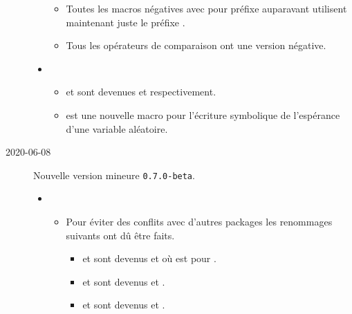 \documentclass[12pt,a4paper]{book}
\begin{document}
\begin{description}
\begin{itemize}[itemsep=.5em]
\begin{itemize}[itemsep=.5em]
            \item Toutes les macros négatives avec pour préfixe  auparavant utilisent maintenant juste le préfixe .
    
            \item Tous les opérateurs de comparaison ont une version négative.
        \end{itemize}
    
    
    
    
        \separation
        \item {}
        \begin{itemize}[itemsep=.5em]
            \item {} et  sont devenues  et  respectivement.
            
            \item {} est une nouvelle macro pour l'écriture symbolique de l'espérance d'une  variable aléatoire.
        \end{itemize}
    \end{itemize}
    


    \medskip
    \item[2020-06-08] Nouvelle version mineure \verb+0.7.0-beta+.
    
    \begin{itemize}[itemsep=.5em]
        \item {}
        \begin{itemize}[itemsep=.5em]
            \item Pour éviter des conflits avec d'autres packages les renommages suivants ont dû être faits.
            \begin{itemize}[itemsep=.5em, label=$\rightarrow$]
                \item {} et  sont devenus  et  où  est pour .
    
                \item {} et  sont devenus  et .
    
                \item {} et  sont devenus  et .
            \end{itemize}
    

\end{itemize}
\end{itemize}
\end{description}
\end{document}
